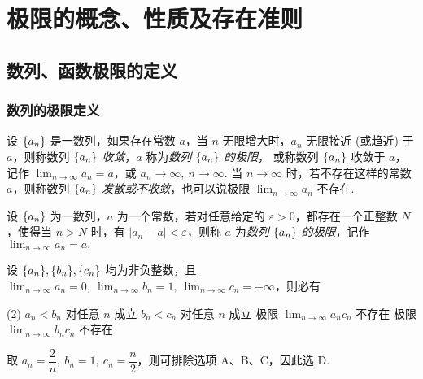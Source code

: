 \section{极限的概念、性质及存在准则}

\subsection{数列、函数极限的定义}

\subsubsection{数列的极限定义}

\begin{definition}[数列极限 A]
    设 $\qty{a_n}$ 是一数列，如果存在常数 $a$，当 $n$ 无限增大时，$a_n$ 无限接近 (或趋近) 于 $a$，则称数列 $\qty{a_n}$ \textit{收敛}，$a$ 称为\textit{数列} $\qty{a_n}$ \textit{的极限}，
    或称数列 $\qty{a_n}$ 收敛于 $a$，记作 $\displaystyle\lim_{n\to\infty}a_n=a$，或 $a_n\to\infty,~n\to\infty$.
    当 $n\to\infty$ 时，若不存在这样的常数 $a$，则称数列 $\qty{a_n}$ \textit{发散或不收敛}，也可以说极限 $\displaystyle\lim_{n\to\infty}a_n$ 不存在.
\end{definition}

\begin{definition}[数列极限 B]
    设 $\qty{a_n}$ 为一数列，$a$ 为一个常数，若对任意给定的 $\varepsilon>0$，都存在一个正整数 $N$，使得当 $n>N$ 时，有 $|a_n-a|<\varepsilon$，则称 $a$ 为\textit{数列} $\qty{a_n}$ \textit{的极限}，记作 $\displaystyle\lim_{n\to\infty}a_n=a.$
\end{definition}

\begin{example}[2003 数一]
    设 $\qty{a_n},\qty{b_n},\qty{c_n}$ 均为非负整数，且 $\displaystyle\lim_{n\to\infty}a_n=0,~\lim_{n\to\infty}b_n=1,~\lim_{n\to\infty}c_n=+\infty$，则必有
    \begin{tasks}(2)
        \task $a_n<b_n$ 对任意 $n$ 成立
        \task $b_n<c_n$ 对任意 $n$ 成立
        \task 极限 $\displaystyle\lim_{n\to\infty}a_nc_n$ 不存在
        \task 极限 $\displaystyle\lim_{n\to\infty}b_nc_n$ 不存在
    \end{tasks}
\end{example}
\begin{solution}
    取 $a_n=\dfrac{2}{n},~b_n=1,~c_n=\dfrac{n}{2}$，则可排除选项 A、B、C，因此选 D.
\end{solution}

